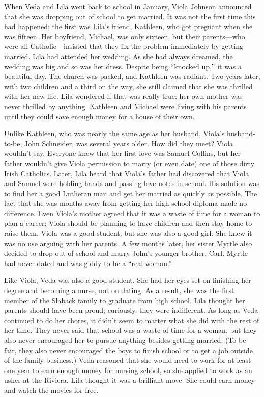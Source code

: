 \documentclass[
  american,
  letterpaper,
]{book}
\begin{document}
When Veda and Lila went back to school in January, Viola Johnson
announced that she was dropping out of school to get married. It was not
the first time this had happened; the first was Lila's friend, Kathleen,
who got pregnant when she was fifteen. Her boyfriend, Michael, was only
sixteen, but their parents---who were all Catholic---insisted that they
fix the problem immediately by getting married. Lila had attended her
wedding. As she had always dreamed, the wedding was big and so was her
dress. Despite being ``knocked up,'' it was a beautiful day. The church
was packed, and Kathleen was radiant. Two years later, with two children
and a third on the way, she still claimed that she was thrilled with her
new life. Lila wondered if that was really true; her own mother was
never thrilled by anything. Kathleen and Michael were living with his
parents until they could save enough money for a house of their own.

Unlike Kathleen, who was nearly the same age as her husband, Viola's
husband-to-be, John Schneider, was several years older. How did they
meet? Viola wouldn't say. Everyone knew that her first love was Samuel
Collins, but her father wouldn't give Viola permission to marry (or even
date) one of those dirty Irish Catholics. Later, Lila heard that Viola's
father had discovered that Viola and Samuel were holding hands and
passing love notes in school. His solution was to find her a good
Lutheran man and get her married as quickly as possible. The fact that
she was months away from getting her high school diploma made no
difference. Even Viola's mother agreed that it was a waste of time for a
woman to plan a career; Viola should be planning to have children and
then stay home to raise them. Viola was a good student, but she was also
a good girl. She knew it was no use arguing with her parents. A few
months later, her sister Myrtle also decided to drop out of school and
marry John's younger brother, Carl. Myrtle had never dated and was giddy
to be a ``real woman.''

Like Viola, Veda was also a good student. She had her eyes set on
finishing her degree and becoming a nurse, not on dating. As a result,
she was the first member of the Slaback family to graduate from high
school. Lila thought her parents should have been proud; curiously, they
were indifferent. As long as Veda continued to do her chores, it didn't
seem to matter what she did with the rest of her time. They never said
that school was a waste of time for a woman, but they also never
encouraged her to pursue anything besides getting married. (To be fair,
they also never encouraged the boys to finish school or to get a job
outside of the family business.) Veda reasoned that she would need to
work for at least one year to earn enough money for nursing school, so
she applied to work as an usher at the Riviera. Lila thought it was a
brilliant move. She could earn money and watch the movies for free.
\end{document}
